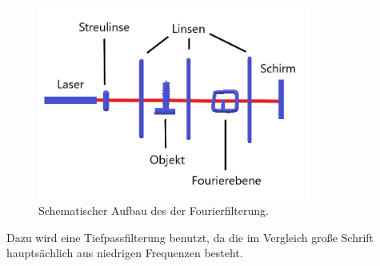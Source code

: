\begin{figure}[h]
	\centering
	\includegraphics[width=0.8\textwidth]{Lana-Bild4}
	\caption{Schematischer Aufbau des der Fourierfilterung.}
	\label{4f-Aufbau}
\end{figure}


Dazu wird eine Tiefpassfilterung benutzt, da die im Vergleich große Schrift hauptsächlich aus niedrigen Frequenzen besteht. 



